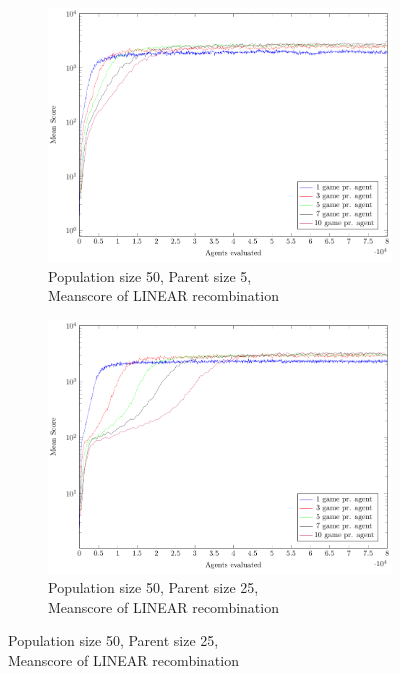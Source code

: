 \begin{figure}
\begin{subfigure}[b]{0.45\textwidth}
    \end{subfigure}
    \begin{subfigure}[b]{0.45\textwidth}
    	\centering
    	\caption{Population size 50, Parent size 5, \\ Meanscore of LINEAR recombination}
        \includegraphics[width=\textwidth]{data/cma_population_offspring/50x_split/linear_l50_o5/mean/PlotFile.pdf}
    \end{subfigure}
    \begin{subfigure}[b]{0.45\textwidth}
    	\centering
    	\caption{Population size 50, Parent size 25, \\ Meanscore of LINEAR recombination}
        \includegraphics[width=\textwidth]{data/cma_population_offspring/50x_split/linear_l50_o25/mean/PlotFile.pdf}

\end{subfigure}
\end{figure}
